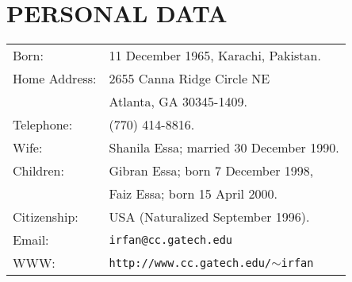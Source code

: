 \section{PERSONAL DATA}
\label{sec:personal}

\begin{tabular}{@{\hspace{\leftmargini}}ll}
Born: & 11 December 1965, Karachi, Pakistan. \\
Home Address: & 2655 Canna Ridge Circle NE \\
&   Atlanta, GA 30345-1409.\\
Telephone: & (770) 414-8816.\\
Wife: & Shanila Essa; married 30 December 1990.\\
Children: & Gibran Essa; born 7 December 1998, \\
    & Faiz Essa; born 15 April 2000. \\
Citizenship: & USA (Naturalized September 1996).\\
Email: & {\tt irfan@cc.gatech.edu} \\
WWW: & {\tt http://www.cc.gatech.edu/$\sim$irfan}
\end{tabular}
\HIDE{ }


%
